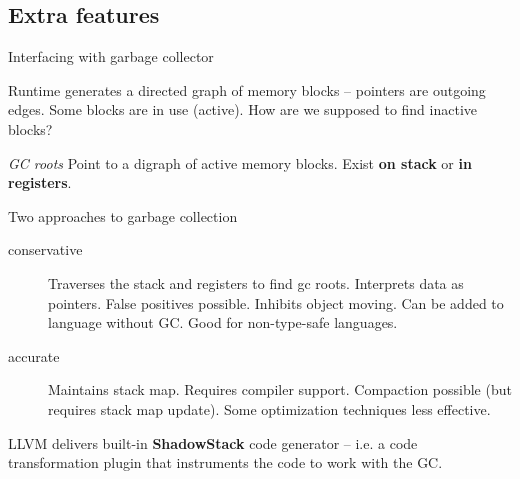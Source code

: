 \documentclass[8pt]{beamer}
\begin{document}
\subsection*{Extra features}

\begin{frame}{Interfacing with garbage collector}
  \begin{alertblock}{}
    Runtime generates a directed graph of memory blocks -- pointers are
    outgoing edges. Some blocks are in use (active). How are we supposed to
    find inactive blocks?
  \end{alertblock}

  \begin{block}{\textit{GC roots}}
    Point to a digraph of active memory blocks. Exist \textbf{on stack} or
    \textbf{in registers}.
  \end{block}

  \begin{block}{Two approaches to garbage collection}
    \begin{description}
      \item[conservative] Traverses the stack and registers to find gc roots.
        Interprets data as pointers. False positives possible. Inhibits object
        moving. Can be added to language without GC. Good for non-type-safe
        languages. 
      \item[accurate] Maintains stack map. Requires compiler support.
        Compaction possible (but requires stack map update). Some optimization
        techniques less effective.
    \end{description}
  \end{block}
  
  \begin{exampleblock}{}
    LLVM delivers built-in \textbf{ShadowStack} code generator -- i.e. a code
    transformation plugin that instruments the code to work with the GC.
  \end{exampleblock} 
\end{frame}
\end{document}
